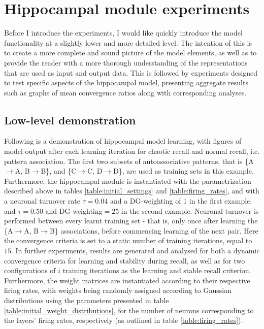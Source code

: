 \section{Hippocampal module experiments}\label{section:hpc-experiments}

Before I introduce the experiments, I would like quickly introduce the model functionality at a slightly lower and more detailed level. The intention of this is to create a more complete and sound picture of the model elements, as well as to provide the reader with a more thorough understanding of the representations that are used as input and output data. 
This is followed by experiments designed to test specific aspects of the hippocampal model, presenting aggregate results such as graphs of mean convergence ratios along with corresponding analyses.

\subsection{Low-level demonstration}
Following is a demonstration of hippocampal model learning, with figures of model output after each learning iteration for chaotic recall and normal recall, i.e. pattern association. The first two subsets of autoassociative patterns, that is \{A$\rightarrow$A, B$\rightarrow$B\}, and \{C$\rightarrow$C, D$\rightarrow$D\}, are used as training sets in this example.
Furthermore, the hippocampal module is instantiated with the parametrization described above in tables \ref{table:initial_settings} and \ref{table:firing_rates}, and with a neuronal turnover rate $\tau = 0.04$ and a DG-weighting of $1$ in the first example, and $\tau=0.50$ and DG-weighting$=25$ in the second example. Neuronal turnover is performed between every learnt training set - that is, only once after learning the \{A$\rightarrow$A, B$\rightarrow$B\} associations, before commencing learning of the next pair. Here the convergence criteria is set to a static number of training iterations, equal to $15$.
In further experiments, results are generated and analysed for both a dynamic convergence criteria for learning and stability during recall, as well as for two configurations of $i$ training iterations as the learning and stable recall criterion. Furthermore, the weight matrices are instantiated according to their respective firing rates, with weights being randomly assigned according to Gaussian distributions using the parameters presented in table \ref{table:initial_weight_distributions}, for the number of neurons corresponding to the layers' firing rates, respectively (as outlined in table \ref{table:firing_rates}).

